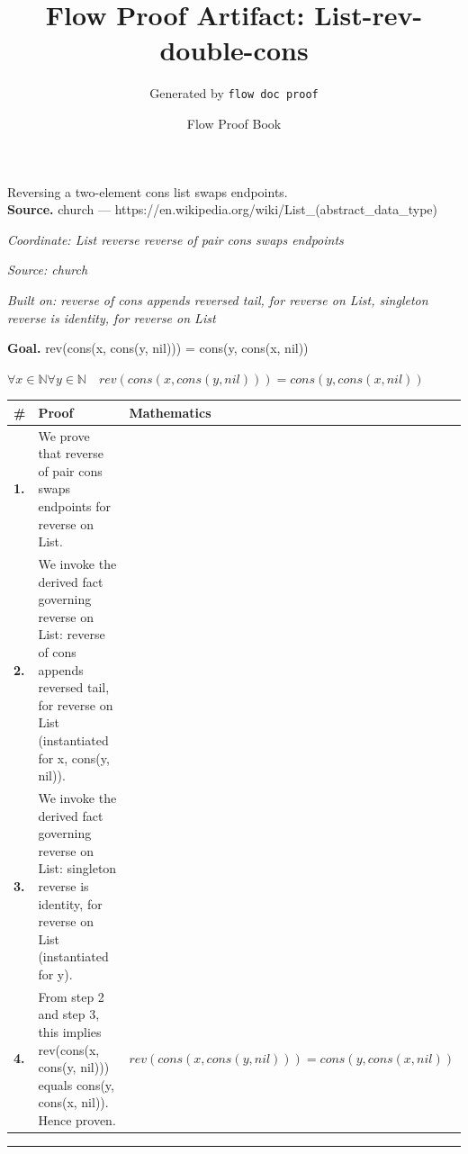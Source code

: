 \documentclass[11pt]{article}
\title{Flow Proof Artifact: List-rev-double-cons}
\author{Generated by \texttt{flow doc proof}}
\date{Flow Proof Book}
\theoremstyle{definition}
\begin{document}
\maketitle
Reversing a two-element cons list swaps endpoints.\\[0.5em]
\textbf{Source.} church — https://en.wikipedia.org/wiki/List\_(abstract\_data\_type)\\[0.5em]
\bigskip
{}\par
\smallskip\noindent\textit{Coordinate: List \cdot reverse \cdot reverse of pair cons swaps endpoints}\par
\smallskip\noindent\textit{Source: church}\par
\smallskip\noindent\textit{Built on: reverse of cons appends reversed tail, for reverse on List, singleton reverse is identity, for reverse on List}\par
\medskip
\noindent\textbf{Goal.} rev(cons(x, cons(y, nil))) = cons(y, cons(x, nil))\par
\noindent$\displaystyle \forall x \in \mathbb{N} \forall y \in \mathbb{N}\quad rev(cons(x, cons(y, nil))) = cons(y, cons(x, nil))$\par
\medskip
\noindent
\begin{tabular}{@{} >{\raggedright\arraybackslash}p{} >{\raggedright\arraybackslash}p{} >{\raggedleft\arraybackslash}p{} @{}}
\textbf{\#} & \textbf{Proof} & \textbf{Mathematics} \\
\midrule
\textbf{1.} & We prove that reverse of pair cons swaps endpoints for reverse on List. & \\[0.45em]
\textbf{2.} & We invoke the derived fact governing reverse on List: reverse of cons appends reversed tail, for reverse on List (instantiated for x, cons(y, nil)). & \\[0.45em]
\textbf{3.} & We invoke the derived fact governing reverse on List: singleton reverse is identity, for reverse on List (instantiated for y). & \\[0.45em]
\textbf{4.} & From step 2 and step 3, this implies rev(cons(x, cons(y, nil))) equals cons(y, cons(x, nil)). Hence proven. & $\displaystyle rev(cons(x, cons(y, nil))) = cons(y, cons(x, nil))$ \\[0.45em]
\bottomrule
\end{tabular}
\label{thm:List-reverse-reverse_of_pair_cons_swaps_endpoints}
\par\medskip\hrule
\end{document}
